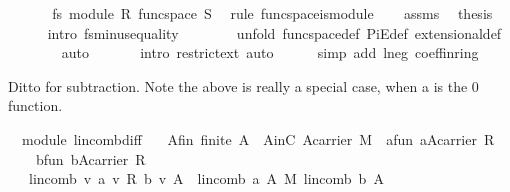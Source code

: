 \begin{isabellebody}
%
\isadelimproof
%
\endisadelimproof
%
\isatagproof
{}\isamarkupfalse%
\ {\isacharminus}\ \isanewline
\ \ \isamarkupfalse%
\ fs{\isacharcolon}\ module\ R\ {\isachardoublequoteopen}func{\isacharunderscore}space\ S{\isachardoublequoteclose}\ \isamarkupfalse%
\ {\isacharparenleft}rule\ func{\isacharunderscore}space{\isacharunderscore}is{\isacharunderscore}module{\isacharparenright}\isanewline
\ \ \isamarkupfalse%
\ assms\ \isamarkupfalse%
\ {\isacharquery}thesis\isanewline
\ \ \ \ \isamarkupfalse%
\ {\isacharparenleft}intro\ fs{\isachardot}minus{\isacharunderscore}equality{\isacharparenright}\isanewline
\ \ \ \ \ \ \isamarkupfalse%
\ {\isacharparenleft}unfold\ func{\isacharunderscore}space{\isacharunderscore}def\ PiE{\isacharunderscore}def\ extensional{\isacharunderscore}def{\isacharparenright}\isanewline
\ \ \ \ \ \ \isamarkupfalse%
\ auto\isanewline
\ \ \ \ \ \isamarkupfalse%
\ {\isacharparenleft}intro\ restrict{\isacharunderscore}ext{\isacharcomma}\ auto{\isacharparenright}\isanewline
\ \ \ \ \isamarkupfalse%
\ {\isacharparenleft}simp\ add{\isacharcolon}\ l{\isacharunderscore}neg\ coeff{\isacharunderscore}in{\isacharunderscore}ring{\isacharparenright}\isanewline
{}\isamarkupfalse%
%
\endisatagproof
{\isafoldproof}%
%
\isadelimproof
%
\endisadelimproof
%
\begin{isamarkuptext}%
Ditto for subtraction. Note the above is really a special case, when a is the 0 function.%
\end{isamarkuptext}%
\isamarkuptrue%
\isamarkupfalse%
\ {\isacharparenleft}\ module{\isacharparenright}\ lincomb{\isacharunderscore}diff{\isacharcolon}\isanewline
\ \ \ A{\isacharunderscore}fin{\isacharcolon}\ {\isachardoublequoteopen}finite\ A{\isachardoublequoteclose}\ \ AinC{\isacharcolon}\ {\isachardoublequoteopen}A{\isasymsubseteq}carrier\ M{\isachardoublequoteclose}\ \ a{\isacharunderscore}fun{\isacharcolon}\ {\isachardoublequoteopen}a{\isasymin}A{\isasymrightarrow}carrier\ R{\isachardoublequoteclose}\ \ \isanewline
\ \ \ \ b{\isacharunderscore}fun{\isacharcolon}\ {\isachardoublequoteopen}b{\isasymin}A{\isasymrightarrow}carrier\ R{\isachardoublequoteclose}\ \isanewline
\ \ \ {\isachardoublequoteopen}lincomb\ {\isacharparenleft}{\isasymlambda}v{\isachardot}\ a\ v\ {\isasymominus}\isactrlbsub R\isactrlesub \ b\ v{\isacharparenright}\ A\ {\isacharequal}\ lincomb\ a\ A\ {\isasymominus}\isactrlbsub M\isactrlesub \ lincomb\ b\ A{\isachardoublequoteclose}\isanewline

\end{isabellebody}
